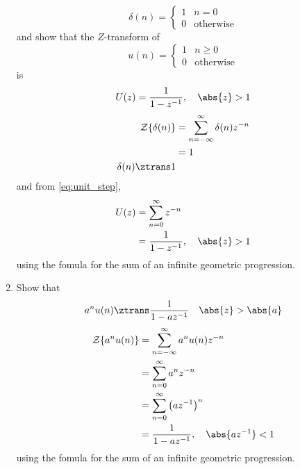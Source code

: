\documentclass[journal,12pt,twocolumn]{IEEEtran}
\renewcommand\thesection{\arabic{section}}
\begin{document}
\begin{enumerate}[label=\thesection.\arabic*]
\begin{equation}
\delta(n)
=
\begin{cases}
1 & n = 0
\\
0 & \text{otherwise}
\end{cases}
\end{equation}
and show that the $Z$-transform of
\begin{equation}
\label{eq:unit_step}
u(n)
=
\begin{cases}
1 & n \ge 0
\\
0 & \text{otherwise}
\end{cases}
\end{equation}
is
\begin{equation}
U(z) = \frac{1}{1-z^{-1}}, \quad \abs{z} > 1
\end{equation}
\solution 
\begin{align}
     {\mathcal {Z}}\{\delta(n)\} &=\sum _{n=-\infty }^{\infty }\delta(n)z^{-n} \\
     &= 1 \\
\delta(n) \ztrans 1
\end{align}
and from \eqref{eq:unit_step},
\begin{align}
U(z) &= \sum _{n= 0}^{\infty}z^{-n}
\\
&=\frac{1}{1-z^{-1}}, \quad \abs{z} > 1
\end{align}
using the fomula for the sum of an infinite geometric progression.
%
\item Show that 
\begin{equation}
     \label{eq:anun}
     a^nu(n) \ztrans \frac{1}{1-az^{-1}} \quad \abs{z} > \abs{a}
\end{equation}
\solution 
\begin{align}
     {\mathcal {Z}}\{a^nu(n)\} &=\sum _{n=-\infty }^{\infty }a^nu(n)z^{-n} \\
     &= \sum _{n=0}^{\infty }a^nz^{-n} \\
     &= \sum _{n=0}^{\infty } \left(az^{-1}\right)^n \\
     &= \frac{1}{1-az^{-1}}, \quad \abs{az^{-1}} < 1
\end{align}
using the fomula for the sum of an infinite geometric progression.



\end{enumerate}
\end{document}
